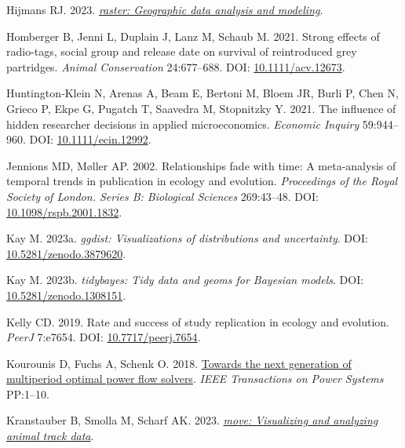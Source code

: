 \documentclass[10pt,a4paper]{article}
\newlength{\cslhangindent}
\newlength{\cslentryspacingunit} %
\newenvironment{CSLReferences}[2] %
 {%
  \setlength{\parindent}{0pt}
  \ifodd #1
  \let\oldpar\par
  \def\par{\hangindent=\cslhangindent\oldpar}
  \fi
  \setlength{\parskip}{#2\cslentryspacingunit}
 }%
 {}
\begin{document}
\begin{CSLReferences}{1}{0}
\leavevmode{}%
Hijmans RJ. 2023. \emph{\href{https://CRAN.R-project.org/package=raster}{{raster}: Geographic data analysis and modeling}}.

\leavevmode{}%
Homberger B, Jenni L, Duplain J, Lanz M, Schaub M. 2021. Strong effects of radio-tags, social group and release date on survival of reintroduced grey partridges. \emph{Animal Conservation} 24:677--688. DOI: \href{https://doi.org/10.1111/acv.12673}{10.1111/acv.12673}.

\leavevmode{}%
Huntington‐Klein N, Arenas A, Beam E, Bertoni M, Bloem JR, Burli P, Chen N, Grieco P, Ekpe G, Pugatch T, Saavedra M, Stopnitzky Y. 2021. The influence of hidden researcher decisions in applied microeconomics. \emph{Economic Inquiry} 59:944--960. DOI: \href{https://doi.org/10.1111/ecin.12992}{10.1111/ecin.12992}.

\leavevmode{}%
Jennions MD, Møller AP. 2002. Relationships fade with time: A meta-analysis of temporal trends in publication in ecology and evolution. \emph{Proceedings of the Royal Society of London. Series B: Biological Sciences} 269:43--48. DOI: \href{https://doi.org/10.1098/rspb.2001.1832}{10.1098/rspb.2001.1832}.

\leavevmode{}%
Kay M. 2023a. \emph{{ggdist}: Visualizations of distributions and uncertainty}. DOI: \href{https://doi.org/10.5281/zenodo.3879620}{10.5281/zenodo.3879620}.

\leavevmode{}%
Kay M. 2023b. \emph{{tidybayes}: Tidy data and geoms for {Bayesian} models}. DOI: \href{https://doi.org/10.5281/zenodo.1308151}{10.5281/zenodo.1308151}.

\leavevmode{}%
Kelly CD. 2019. Rate and success of study replication in ecology and evolution. \emph{PeerJ} 7:e7654. DOI: \href{https://doi.org/10.7717/peerj.7654}{10.7717/peerj.7654}.

\leavevmode{}%
Kourounis D, Fuchs A, Schenk O. 2018. \href{https://doi.org/10.1109/TPWRS.2017.2789187}{Towards the next generation of multiperiod optimal power flow solvers}. \emph{IEEE Transactions on Power Systems} PP:1--10.

\leavevmode{}%
Kranstauber B, Smolla M, Scharf AK. 2023. \emph{\href{https://CRAN.R-project.org/package=move}{{move}: Visualizing and analyzing animal track data}}.


\end{CSLReferences}
\end{document}
